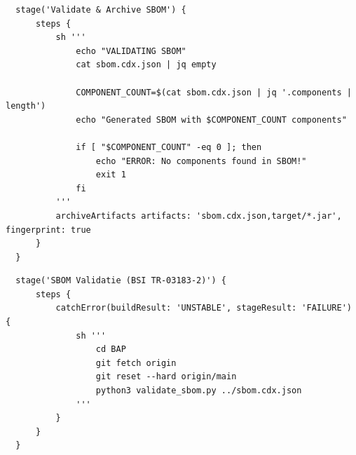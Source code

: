 \begin{listing}[H]
    \caption{Validate \& archive SBOM-stage}
    \label{lst:sbom-validate-archive}
    \begin{verbatim}
  stage('Validate & Archive SBOM') {
      steps {
          sh '''
              echo "VALIDATING SBOM"
              cat sbom.cdx.json | jq empty
  
              COMPONENT_COUNT=$(cat sbom.cdx.json | jq '.components | length')
              echo "Generated SBOM with $COMPONENT_COUNT components"
  
              if [ "$COMPONENT_COUNT" -eq 0 ]; then
                  echo "ERROR: No components found in SBOM!"
                  exit 1
              fi
          '''
          archiveArtifacts artifacts: 'sbom.cdx.json,target/*.jar', fingerprint: true
      }
  }
    \end{verbatim}
\end{listing}

\begin{listing}[H]
    \caption{BSI TR-03183-2 SBOM-validatiestage}
    \label{lst:sbom-bsi-validate}
    \begin{verbatim}
  stage('SBOM Validatie (BSI TR-03183-2)') {
      steps {
          catchError(buildResult: 'UNSTABLE', stageResult: 'FAILURE') {
              sh '''
                  cd BAP
                  git fetch origin
                  git reset --hard origin/main
                  python3 validate_sbom.py ../sbom.cdx.json
              '''
          }
      }
  }
    \end{verbatim}
\end{listing}

\FloatBarrier

